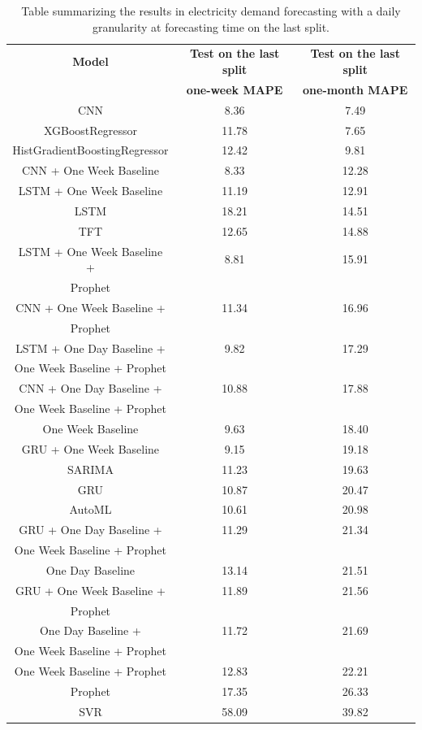 \begin{table}[H]
\centering
\begin{tabular}{|c|c|c|}
\hline
\textbf{Model} & \textbf{Test on the last split} & \textbf{Test on the last split}\\
 & \textbf{one-week MAPE} & \textbf{one-month MAPE}\\
\hline
CNN & 8.36 & 7.49\\
\hline
XGBoostRegressor & 11.78 & 7.65\\
\hline
HistGradientBoostingRegressor & 12.42 & 9.81\\
\hline
CNN + One Week Baseline & 8.33 & 12.28\\
\hline
LSTM + One Week Baseline & 11.19 & 12.91\\
\hline
LSTM & 18.21 & 14.51\\
\hline
TFT & 12.65 & 14.88\\
\hline
LSTM + One Week Baseline + & 8.81 & 15.91\\
Prophet & & \\
\hline
CNN + One Week Baseline + & 11.34 & 16.96\\
Prophet & & \\
\hline
LSTM + One Day Baseline + & 9.82 & 17.29\\
One Week Baseline + Prophet & & \\
\hline
CNN + One Day Baseline + & 10.88 & 17.88\\
One Week Baseline + Prophet & & \\
\hline
One Week Baseline & 9.63 & 18.40\\
\hline
GRU + One Week Baseline & 9.15 & 19.18\\
\hline
SARIMA & 11.23 & 19.63\\
\hline
GRU & 10.87 & 20.47\\
\hline
AutoML & 10.61 & 20.98\\
\hline
GRU + One Day Baseline + & 11.29 & 21.34\\
One Week Baseline + Prophet & & \\
\hline
One Day Baseline & 13.14 & 21.51\\
\hline
GRU + One Week Baseline + & 11.89 & 21.56\\
Prophet & & \\
\hline
One Day Baseline + & 11.72 & 21.69\\
One Week Baseline + Prophet & & \\
\hline
One Week Baseline + Prophet & 12.83 & 22.21\\
\hline
Prophet & 17.35 & 26.33\\
\hline
SVR & 58.09 & 39.82\\
\hline
\end{tabular}
\caption{Table summarizing the results in electricity demand forecasting with a daily granularity at forecasting time on the last split.}
\label{tab:demanddailyresultsforecast}
\end{table}

